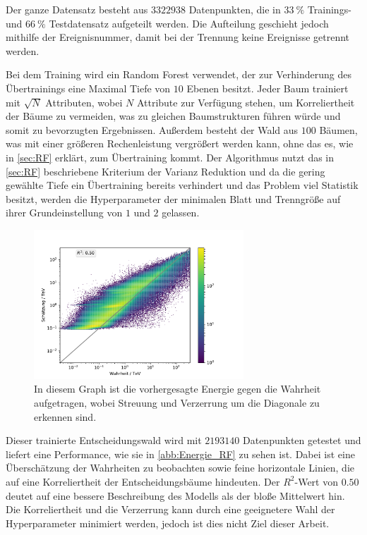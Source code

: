 Der ganze Datensatz besteht aus $\num{3322938}$ Datenpunkten, die in $\SI{33}{\percent}$ Trainings- und $\SI{66}{\percent}$ Testdatensatz aufgeteilt werden.
Die Aufteilung geschieht jedoch mithilfe der Ereignisnummer, damit bei der Trennung keine Ereignisse getrennt werden.

Bei dem Training wird ein Random Forest verwendet, der zur Verhinderung des Übertrainings eine Maximal Tiefe von $10$ Ebenen besitzt.
Jeder Baum trainiert mit $\sqrt{N}$ Attributen, wobei $N$ Attribute zur Verfügung stehen, um Korreliertheit der Bäume zu vermeiden,
was zu gleichen Baumstrukturen führen würde und somit zu bevorzugten Ergebnissen.
Außerdem besteht der Wald aus $100$ Bäumen, was mit einer größeren Rechenleistung vergrößert werden kann, ohne
das es, wie in \autoref{sec:RF} erklärt, zum Übertraining kommt.
Der Algorithmus nutzt das in \autoref{sec:RF} beschriebene Kriterium der Varianz Reduktion und da die gering gewählte Tiefe
ein Übertraining bereits verhindert und das Problem viel Statistik besitzt, werden die Hyperparameter
der minimalen Blatt und Trenngröße auf ihrer Grundeinstellung von $1$ und $2$ gelassen.

\begin{figure}
  \includegraphics[width=0.7\textwidth]{Plots/RF.pdf}
  \centering
  \caption{In diesem Graph ist die vorhergesagte Energie gegen die Wahrheit aufgetragen, wobei Streuung und Verzerrung um die
          Diagonale zu erkennen sind.}
  \label{abb:Energie_RF}
\end{figure}
Dieser trainierte Entscheidungswald wird mit $\num{2193140}$ Datenpunkten getestet und liefert eine Performance, wie sie in \autoref{abb:Energie_RF} zu sehen ist.
Dabei ist eine Überschätzung der Wahrheiten zu beobachten sowie feine horizontale Linien, die auf eine Korreliertheit der Entscheidungsbäume hindeuten.
Der $R^2$-Wert von $\num{0.50}$ deutet auf eine bessere Beschreibung des Modells als der bloße Mittelwert hin.
Die Korreliertheit und die Verzerrung kann durch eine geeignetere Wahl der Hyperparameter minimiert werden, jedoch ist dies nicht Ziel dieser
Arbeit.

